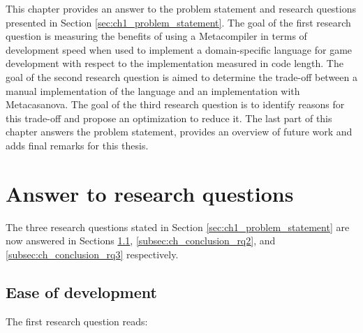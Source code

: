 This chapter provides an answer to the problem statement and research questions presented in Section \ref{sec:ch1_problem_statement}. The goal of the first research question is measuring the benefits of using a Metacompiler in terms of development speed when used to implement a domain-specific language for game development with respect to the implementation measured in code length. The goal of the second research question is aimed to determine the trade-off between a manual implementation of the language and an implementation with Metacasanova. The goal of the third research question is to identify reasons for this trade-off and propose an optimization to reduce it. The last part of this chapter answers the problem statement, provides an overview of future work and adds final remarks for this thesis.

\section{Answer to research questions}
\label{sec:ch_conclusion_answer_research_questions}
The three research questions stated in Section \ref{sec:ch1_problem_statement} are now answered  in Sections \ref{subsec:ch_conclusion_rq1}, \ref{subsec:ch_conclusion_rq2}, and \ref{subsec:ch_conclusion_rq3} respectively.

\subsection{Ease of development}
\label{subsec:ch_conclusion_rq1}

The first research question reads:\\\\
\\\\

